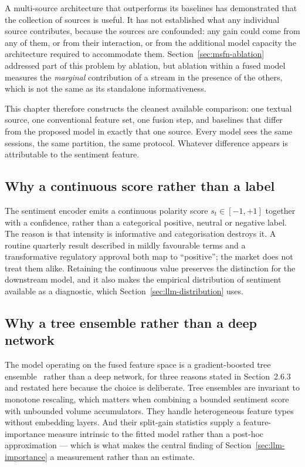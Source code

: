 A multi-source architecture that outperforms its baselines has demonstrated that the collection
of sources is useful. It has not established what any individual source contributes, because the
sources are confounded: any gain could come from any of them, or from their interaction, or from
the additional model capacity the architecture required to accommodate them.
Section~\ref{sec:msfn-ablation} addressed part of this problem by ablation, but ablation within a
fused model measures the \emph{marginal} contribution of a stream in the presence of the others,
which is not the same as its standalone informativeness.

This chapter therefore constructs the cleanest available comparison: one textual source, one
conventional feature set, one fusion step, and baselines that differ from the proposed model in
exactly that one source. Every model sees the same sessions, the same partition, the same
protocol. Whatever difference appears is attributable to the sentiment feature.

\subsection{Why a continuous score rather than a label}

The sentiment encoder emits a continuous polarity score $s_t \in [-1,+1]$ together with a
confidence, rather than a categorical positive, neutral or negative label. The reason is that
intensity is informative and categorisation destroys it. A routine quarterly result described in
mildly favourable terms and a transformative regulatory approval both map to ``positive''; the
market does not treat them alike. Retaining the continuous value preserves the distinction for
the downstream model, and it also makes the empirical distribution of sentiment available as a
diagnostic, which Section~\ref{sec:llm-distribution} uses.

\subsection{Why a tree ensemble rather than a deep network}

The model operating on the fused feature space is a gradient-boosted tree
ensemble~\cite{chen2016xgboost} rather than a deep network, for three reasons stated in
Section~2.6.3 and restated here because the choice is deliberate. Tree ensembles are invariant to
monotone rescaling, which matters when combining a bounded sentiment score with unbounded volume
accumulators. They handle heterogeneous feature types without embedding layers. And their
split-gain statistics supply a feature-importance measure intrinsic to the fitted model rather
than a post-hoc approximation --- which is what makes the central finding of
Section~\ref{sec:llm-importance} a measurement rather than an estimate.

